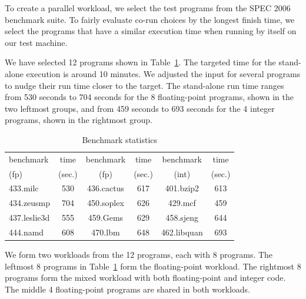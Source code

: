 To create a parallel workload, we select the test programs from the
SPEC 2006 benchmark suite.  To fairly evaluate co-run choices by the
longest finish time, we select the programs that have a similar
execution time when running by itself on our test machine.  
 
We have selected 12 programs shown in Table~\ref{tbl:bench}.  The
targeted time for the stand-alone execution is around 10 minutes.  
We adjusted the input for several programs to nudge their
run time closer to the target.  The stand-alone run time ranges from
530 seconds to 704 seconds for the 8 floating-point programs, shown in
the two leftmost groups, and from 459 seconds to 693 seconds for the 4
integer programs, shown in the rightmost group.

\begin{table}[h]
\centering
\small
\begin{tabular}{|l|c|c|c|c|c|}
\hline
benchmark & time & benchmark &time & benchmark & time \\
(fp) &(sec.)& (fp) &(sec.) & (int) &(sec.)\\ \hline \hline
433.milc & 530 &436.cactus &617& 401.bzip2&613 \\ \hline
434.zeusmp &704 &450.soplex &626& 429.mcf&459 \\ \hline
437.leslie3d &555& 459.Gems &629& 458.sjeng&644 \\ \hline
444.namd &608& 470.lbm &648& 462.libquan&693 \\ \hline
\end{tabular}
\caption{Benchmark statistics}
\label{tbl:bench}
\end{table}

We form two workloads from the 12 programs, each with 8 programs. The
leftmost 8 programs in Table~\ref{tbl:bench} form the floating-point
workload.  The rightmost 8 programs form the mixed workload with both
floating-point and integer code.  The middle 4 floating-point programs
are shared in both workloads.

